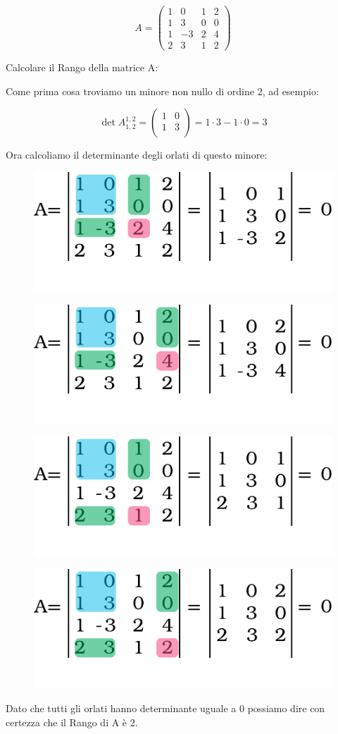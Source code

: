 \begin{esercizio}
	$$
	   A=\begin{pmatrix}
			1 &  0 & 1 & 2\\
			1 &  3 & 0 & 0\\
			1 & -3 & 2 & 4\\
			2 &  3 & 1 & 2
		\end{pmatrix}
	$$
	
	Calcolare il Rango della matrice A:
	
	Come prima cosa troviamo un minore non nullo di ordine 2, ad esempio:
	
	$$
	\det A_{1,2}^{1,2}=\begin{pmatrix}
		1 &  0\\
		1 &  3\\
	\end{pmatrix}=1\cdot 3-1\cdot 0=3
	$$
	
	Ora calcoliamo il determinante degli orlati di questo minore:
	
	\begin{figure}[H]
		\centering
		\includegraphics[height=0.16\textwidth]{Figures/orlati_es_1.pdf}
	\end{figure}
	
	\begin{figure}[H]
		\centering
		\includegraphics[height=0.16\textwidth]{Figures/orlati_es_2.pdf}
	\end{figure}
	
	\begin{figure}[H]
		\centering
		\includegraphics[height=0.16\textwidth]{Figures/orlati_es_3.pdf}
	\end{figure}
	
	\begin{figure}[H]
		\centering
		\includegraphics[height=0.16\textwidth]{Figures/orlati_es_4.pdf}
	\end{figure}
	
	Dato che tutti gli orlati hanno determinante uguale a 0 possiamo dire con certezza che il Rango di A è 2.
\end{esercizio}

